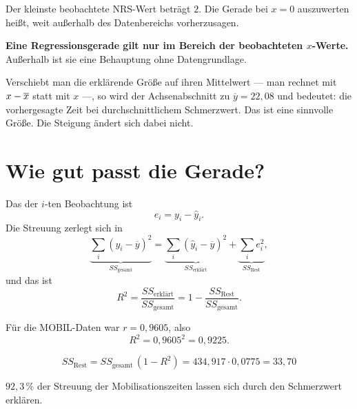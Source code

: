 \begin{warnung}
Der kleinste beobachtete NRS-Wert beträgt $2$. Die Gerade bei $x = 0$ auszuwerten heißt, weit außerhalb des Datenbereichs vorherzusagen.

\begin{center}
\begin{minipage}{0.9\textwidth}
\textbf{Eine Regressionsgerade gilt nur im Bereich der beobachteten $x$-Werte.} Außerhalb ist sie eine Behauptung ohne Datengrundlage.
\end{minipage}
\end{center}

Verschiebt man die erklärende Größe auf ihren Mittelwert --- man rechnet mit $x - \overline{x}$ statt mit $x$ ---, so wird der Achsenabschnitt zu $\overline y = 22{,}08$ und bedeutet: die vorhergesagte Zeit bei durchschnittlichem Schmerzwert. Das ist eine sinnvolle Größe. Die Steigung ändert sich dabei nicht.
\end{warnung}

\section{Wie gut passt die Gerade?}

\begin{definition}
Das  der $i$-ten Beobachtung ist
\[ e_i = y_i - \hat y_i . \]
Die Streuung zerlegt sich in
\[ \underbrace{\sum_i (y_i-\overline y)^2}_{SS_{\text{gesamt}}} = \underbrace{\sum_i (\hat y_i - \overline y)^2}_{SS_{\text{erklärt}}} + \underbrace{\sum_i e_i^2}_{SS_{\text{Rest}}} , \]
und das  ist
\[ R^2 = \frac{SS_{\text{erklärt}}}{SS_{\text{gesamt}}} = 1 - \frac{SS_{\text{Rest}}}{SS_{\text{gesamt}}} . \]
\end{definition}

\begin{merksatz}
Für die MOBIL-Daten war $r = 0{,}9605$, also
\[ R^2 = 0{,}9605^2 = 0{,}9225 . \]

\[ SS_{\text{Rest}} = SS_{\text{gesamt}}\,(1-R^2) = 434{,}917 \cdot 0{,}0775 = 33{,}70 \]

$92{,}3\,\%$ der Streuung der Mobilisationszeiten lassen sich durch den Schmerzwert erklären.

\begin{center}
\begin{minipage}{0.88\textwidth}
\end{minipage}
\end{center}
\end{merksatz}

